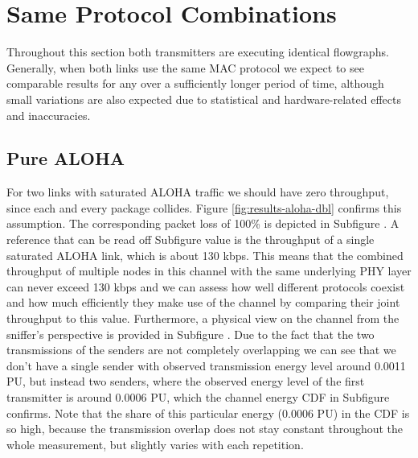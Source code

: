 \section{Same Protocol Combinations}

Throughout this section both transmitters are executing identical flowgraphs. Generally, when both links use the same MAC protocol we expect to see comparable results for any over a sufficiently longer period of time, although small variations are also expected due to statistical and hardware-related effects and inaccuracies. 

\subsection{Pure ALOHA}

For two links with saturated ALOHA traffic we should have zero throughput, since each and every package collides. Figure \ref{fig:results-aloha-dbl}  confirms this assumption. The corresponding packet loss of 100\% is depicted in Subfigure . A reference that can be read off Subfigure  value is the throughput of a single saturated ALOHA link, which is about 130 kbps. This means that the combined throughput of multiple nodes in this channel with the same underlying PHY layer can never exceed 130 kbps and we can assess how well different protocols coexist and how much efficiently they make use of the channel by comparing their joint throughput to this value. Furthermore, a physical view on the channel from the sniffer's perspective is provided in Subfigure . Due to the fact that the two transmissions of the senders are not completely overlapping we can see that we don't have a single sender with observed transmission energy level around 0.0011 PU, but instead two senders, where the observed energy level of the first transmitter is around 0.0006 PU, which the channel energy CDF in Subfigure  confirms. Note that the share of this particular energy (0.0006 PU) in the CDF is so high, because the transmission overlap does not stay constant throughout the whole measurement, but slightly varies with each repetition.
